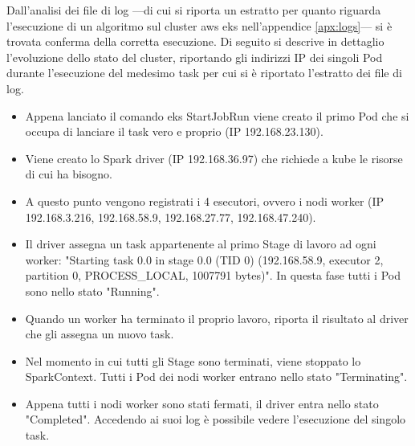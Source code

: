 \documentclass[12pt,a4paper,fleqn,titlepage]{report}
\begin{document}
            Dall'analisi dei file di log —di cui si riporta un estratto per quanto riguarda l'esecuzione di un algoritmo sul cluster \gls{aws} \gls{eks} nell'appendice \ref{apx:logs}— si è trovata conferma della corretta esecuzione.
            Di seguito si descrive in dettaglio l'evoluzione dello stato del cluster, riportando gli indirizzi IP dei singoli Pod durante l'esecuzione del medesimo task per cui si è riportato l'estratto dei file di log.
            \begin{itemize}
                \item Appena lanciato il comando \gls{eks} StartJobRun viene creato il primo Pod che si occupa di lanciare il task vero e proprio (IP 192.168.23.130).
                \item Viene creato lo Spark driver (IP 192.168.36.97) che richiede a \gls{kube} le risorse di cui ha bisogno.
                \item A questo punto vengono registrati i 4 esecutori, ovvero i nodi worker (IP 192.168.3.216, 192.168.58.9, 192.168.27.77, 192.168.47.240).
                \item Il driver assegna un task appartenente al primo Stage di lavoro ad ogni worker: "Starting task 0.0 in stage 0.0 (TID 0) (192.168.58.9, executor 2, partition 0, PROCESS\_LOCAL, 1007791 bytes)". In questa fase tutti i Pod sono nello stato "Running".
                \item Quando un worker ha terminato il proprio lavoro, riporta il risultato al driver che gli assegna un nuovo task.
                \item Nel momento in cui tutti gli Stage sono terminati, viene stoppato lo SparkContext. Tutti i Pod dei nodi worker entrano nello stato "Terminating".
                \item Appena tutti i nodi worker sono stati fermati, il driver entra nello stato "Completed". Accedendo ai suoi log è possibile vedere l'esecuzione del singolo task.
            \end{itemize}
\end{document}
